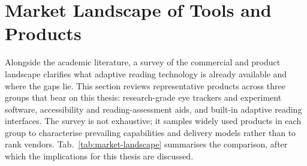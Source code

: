 \section{Market Landscape of Tools and Products}
\label{sec:market-landscape}

Alongside the academic literature, a survey of the commercial and product landscape clarifies what adaptive reading technology is already available and where the gaps lie.
This section reviews representative products across three groups that bear on this thesis: research-grade eye trackers and experiment software, accessibility and reading-assessment aids, and built-in adaptive reading interfaces.
The survey is not exhaustive; it samples widely used products in each group to characterise prevailing capabilities and delivery models rather than to rank vendors.
Tab.~\ref{tab:market-landscape} summarises the comparison, after which the implications for this thesis are discussed.

